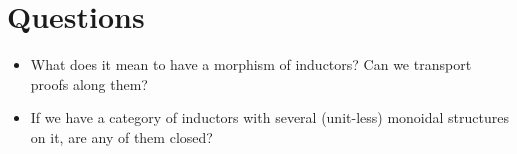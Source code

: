 \documentclass{amsart}
\begin{document}

\section{Questions}

\begin{itemize}
\item What does it mean to have a morphism of inductors? Can we
  transport proofs along them?
\item If we have a category of inductors with several (unit-less)
  monoidal structures on it, are any of them closed?
\end{itemize}
\end{document}

